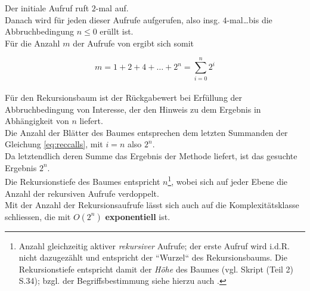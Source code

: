 \noindent
Der initiale Aufruf  ruft $2$-mal  auf.\\
Danach wird für jeden dieser Aufrufe  aufgerufen, also insg. $4$-mal\ldots bis die Abbruchbedingung $n \leq 0$ erüllt ist.\\
Für die Anzahl $m$ der Aufrufe von  ergibt sich somit


\begin{equation}
     m = 1 + 2 + 4 + \dots + 2^n = \sum_{i=0}^n 2^i
    \label{eq:reccalls}
\end{equation}\\

\noindent
Für den Rekursionsbaum ist der Rückgabewert bei Erfüllung der Abbruchbedingung von Interesse, der den Hinweis zu dem Ergebnis in Abhängigkeit von $n$ liefert.\\
Die Anzahl der Blätter des Baumes entsprechen dem letzten Summanden der Gleichung \ref{eq:reccalls}, mit $i=n$
also $2^n$.\\
Da letztendlich deren Summe das Ergebnis der Methode  liefert, ist das gesuchte Ergebnis $2^n$.\\

\noindent
Die Rekursionstiefe des Baumes entspricht $n$\footnote{
Anzahl gleichzeitig aktiver \textit{rekursiver} Aufrufe; der erste Aufruf wird i.d.R. nicht dazugezählt und entspricht der ``Wurzel`` des Rekursionsbaums.
Die Rekursionstiefe entspricht damit der \textit{Höhe} des Baumes (vgl. Skript (Teil 2) S.34); bzgl. der Begriffsbestimmung siehe hierzu auch \cite[144 f.]{CK75}.
}, wobei sich auf jeder Ebene die Anzahl der rekursiven Aufrufe verdoppelt.\\
Mit der Anzahl der Rekursionsaufrufe lässt sich auch auf die Komplexitätsklasse schliessen, die mit $O(2^n)$ \textbf{exponentiell} ist.

